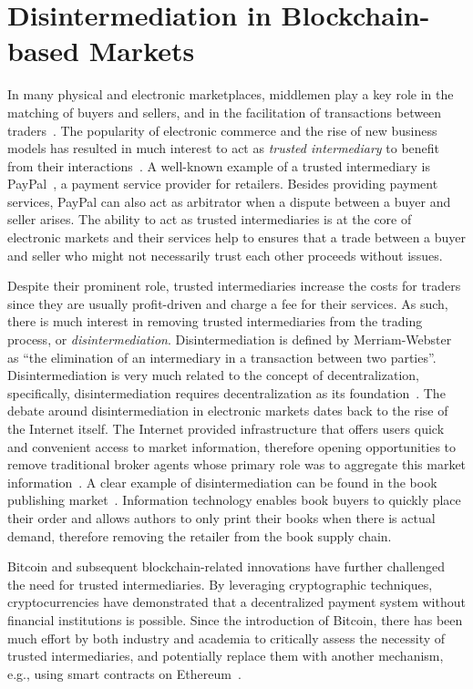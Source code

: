\section{Disintermediation in Blockchain-based Markets}
In many physical and electronic marketplaces, middlemen play a key role in the matching of buyers and sellers, and in the facilitation of transactions between traders~\cite{bakos1998emerging}.
The popularity of electronic commerce and the rise of new business models has resulted in much interest to act as \emph{trusted intermediary} to benefit from their interactions~\cite{clark1999electronic}.
A well-known example of a trusted intermediary is PayPal~\cite{paypal}, a payment service provider for retailers.
Besides providing payment services, PayPal can also act as arbitrator when a dispute between a buyer and seller arises.
The ability to act as trusted intermediaries is at the core of electronic markets and their services help to ensures that a trade between a buyer and seller who might not necessarily trust each other proceeds without issues.

Despite their prominent role, trusted intermediaries increase the costs for traders since they are usually profit-driven and charge a fee for their services.
As such, there is much interest in removing trusted intermediaries from the trading process, or \emph{disintermediation}.
Disintermediation is defined by Merriam-Webster as \enquote{the elimination of an intermediary in a transaction between two parties}.
Disintermediation is very much related to the concept of decentralization, specifically, disintermediation requires decentralization as its foundation~\cite{guo2016blockchain}.
The debate around disintermediation in electronic markets dates back to the rise of the Internet itself. %
The Internet provided infrastructure that offers users quick and convenient access to market information, therefore opening opportunities to remove traditional broker agents whose primary role was to aggregate this market information~\cite{wigand2020whatever}.
A clear example of disintermediation can be found in the book publishing market~\cite{giaglis1999disintermediation}.
Information technology enables book buyers to quickly place their order and allows authors to only print their books when there is actual demand, therefore removing the retailer from the book supply chain.

Bitcoin and subsequent blockchain-related innovations have further challenged the need for trusted intermediaries.
By leveraging cryptographic techniques, cryptocurrencies have demonstrated that a decentralized payment system without financial institutions is possible.
Since the introduction of Bitcoin, there has been much effort by both industry and academia to critically assess the necessity of trusted intermediaries, and potentially replace them with another mechanism, e.g., using smart contracts on Ethereum~\cite{lande2018sok}.

